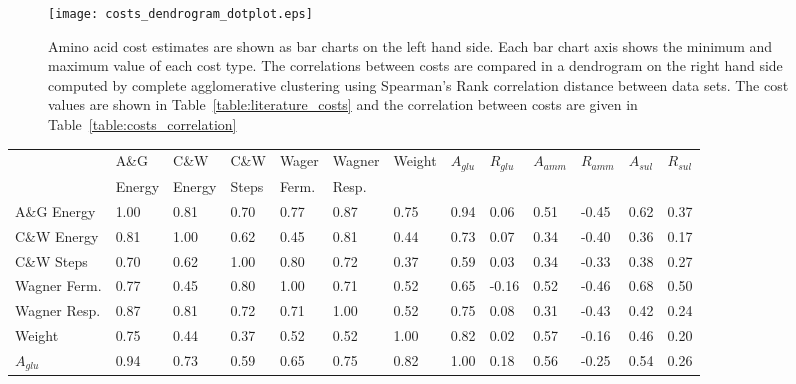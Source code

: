 \begin{sidewaysfigure}%
\centering
\texttt{[image: costs\_dendrogram\_dotplot.eps]}
\caption[Comparison of amino acid cost estimates]{Amino acid cost estimates are shown as bar charts on the left hand side. Each bar chart axis shows the minimum and maximum value of each cost type. The correlations between costs are compared in a dendrogram on the right hand side computed by complete agglomerative clustering using Spearman's Rank correlation distance between data sets. The cost values are shown in Table~\vref{table:literature_costs} and the correlation between costs are given in Table~\vref{table:costs_correlation}}
\label{figure:costs_dendrogram_dotplot}
\end{sidewaysfigure}%

\begin{sidewaystable}%
  \centering
  \begin{footnotesize}
    \begin{tabular}{p{2.2cm} *{12}{p{1.2cm}} }
                                                                                \toprule
           & A\&G   & C\&W   & C\&W  & Wager        & Wagner      & Weight & $A_{glu}$ & $R_{glu}$ & $A_{amm}$ & $R_{amm}$ & $A_{sul}$ & $R_{sul}$ \\
           & Energy & Energy & Steps & Ferm. & Resp. &            &               &               &              &                &                &                \\ \midrule
A\&G Energy  & 1.00  & 0.81  & 0.70  & 0.77  & 0.87  & 0.75  & 0.94  & 0.06  & 0.51  & -0.45 & 0.62  & 0.37  \\
C\&W Energy  & 0.81  & 1.00  & 0.62  & 0.45  & 0.81  & 0.44  & 0.73  & 0.07  & 0.34  & -0.40 & 0.36  & 0.17  \\
C\&W Steps   & 0.70  & 0.62  & 1.00  & 0.80  & 0.72  & 0.37  & 0.59  & 0.03  & 0.34  & -0.33 & 0.38  & 0.27  \\
Wagner Ferm. & 0.77  & 0.45  & 0.80  & 1.00  & 0.71  & 0.52  & 0.65  & -0.16 & 0.52  & -0.46 & 0.68  & 0.50  \\
Wagner Resp. & 0.87  & 0.81  & 0.72  & 0.71  & 1.00  & 0.52  & 0.75  & 0.08  & 0.31  & -0.43 & 0.42  & 0.24  \\
Weight       & 0.75  & 0.44  & 0.37  & 0.52  & 0.52  & 1.00  & 0.82  & 0.02  & 0.57  & -0.16 & 0.46  & 0.20  \\
$A_{glu}$    & 0.94  & 0.73  & 0.59  & 0.65  & 0.75  & 0.82  & 1.00  & 0.18  & 0.56  & -0.25 & 0.54  & 0.26  \\

\end{tabular}
\end{footnotesize}
\end{sidewaystable}
